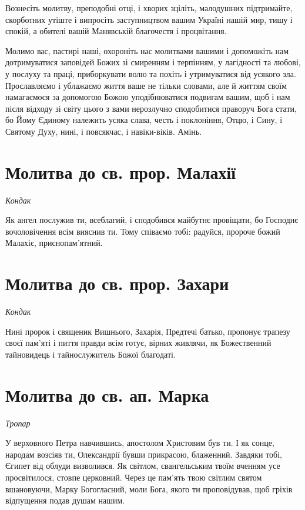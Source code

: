 \documentclass[chapters.tex]{subfiles}
\begin{document}
Вознесіть молитву, преподобні отці, і хворих зціліть, малодушних підтримайте, скорботних утіште і випросіть заступництвом вашим Україні нашій мир, тишу і спокій, а обителі вашій Манявській благочестя і процвітання.

Молимо вас, пастирі наші, охороніть нас молитвами вашими і допоможіть нам дотримуватися заповідей Божих зі смиренням і терпінням, у лагідності та любові, у послуху та праці, приборкувати волю та похіть і утримуватися від усякого зла. Прославляємо і ублажаємо життя ваше не тільки словами, але й життям своїм намагаємося за допомогою Божою уподібнюватися подвигам вашим, щоб і нам після відходу зі світу цього з вами нерозлучно сподобитися праворуч Бога стати, бо Йому Єдиному належить усяка слава, честь і поклоніння, Отцю, і Сину, і Святому Духу, нині, і повсякчас, і навіки-віків. Амінь.

\section{Молитва до св. прор. Малахії}
\emph{Кондак}

Як ангел послужив ти, всеблагий, і сподобився майбутнє провіщати, бо Господнє вочоловічення всім вияснив ти. Тому співаємо тобі: радуйся, пророче божий Малахіє, приснопам’ятний.

\section{Молитва до св. прор. Захари}
\emph{Кондак}

Нині пророк і священик Вишнього, Захарія, Предтечі батько, пропонує трапезу своєї пам’яті і пиття правди всім готує, вірних живлячи, як Божественний тайновидець і тайнослужитель Божої благодаті.

\section{Молитва до св. ап. Марка}
\emph{Тропар}

У верховного Петра навчившись, апостолом Христовим був ти. І як сонце, народам возсіяв ти, Олександрії бувши прикрасою, блаженний. Завдяки тобі, Єгипет від облуди визволився. Як світлом, євангельським твоїм вченням усе просвітилося, стовпе церковний. Через це пам’ять твою світлим святом вшановуючи, Марку Богогласний, моли Бога, якого ти проповідував, щоб гріхів відпущення подав душам нашим.
\end{document}
